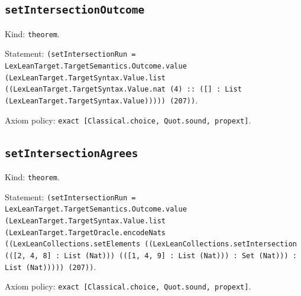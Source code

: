 \documentclass[11pt]{article}
\begin{document}
\subsection*{\texttt{setIntersectionOutcome}}
\noindent Kind: \texttt{theorem}.\par
\noindent Statement: \texttt{(setIntersectionRun = LexLeanTarget.TargetSemantics.Outcome.value (LexLeanTarget.TargetSyntax.Value.list ((LexLeanTarget.TargetSyntax.Value.nat (4) :: ([] : List (LexLeanTarget.TargetSyntax.Value))))) (207))}.\par
\noindent Axiom policy: \texttt{exact [Classical.choice, Quot.sound, propext]}.\par
\subsection*{\texttt{setIntersectionAgrees}}
\noindent Kind: \texttt{theorem}.\par
\noindent Statement: \texttt{(setIntersectionRun = LexLeanTarget.TargetSemantics.Outcome.value (LexLeanTarget.TargetSyntax.Value.list (LexLeanTarget.TargetOracle.encodeNats ((LexLeanCollections.setElements ((LexLeanCollections.setIntersection (([2, 4, 8] : List (Nat))) (([1, 4, 9] : List (Nat))) : Set (Nat))) : List (Nat))))) (207))}.\par
\noindent Axiom policy: \texttt{exact [Classical.choice, Quot.sound, propext]}.\par
\end{document}
